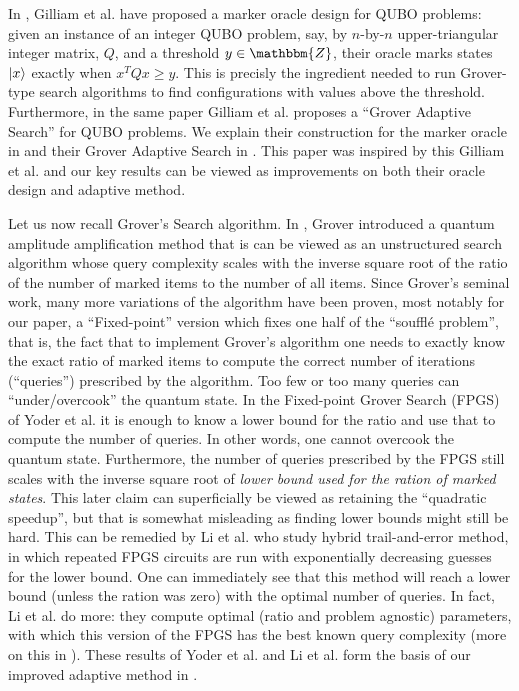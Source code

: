 \documentclass[reqno, 12pt]{amsart}
\numberwithin{equation}{section}                %
\def\Z{\mathbbm{Z}}
\begin{document}
\smallskip

In \cite{gilliam_grover_2021}, Gilliam et al. have proposed a marker oracle design for QUBO problems: given an instance of an integer QUBO problem, say, by $n$-by-$n$ upper-triangular integer matrix, $Q$, and a threshold $y \in \Z$, their oracle marks states $\ket{x}$ exactly when $x^T Q x \geqslant y$. This is precisly the ingredient needed to run Grover-type search algorithms to find configurations with values above the threshold. Furthermore, in the same paper Gilliam et al. proposes a ``Grover Adaptive Search'' for QUBO problems. We explain their construction for the marker oracle in  and their Grover Adaptive Search in . This paper was inspired by this Gilliam et al. and our key results can be viewed as improvements on both their oracle design and adaptive method.

Let us now recall Grover's Search algorithm. In \cite{grover_quantum_97}, Grover introduced a quantum amplitude amplification method that is can be viewed as an unstructured search algorithm whose query complexity scales with the inverse square root of the ratio of the number of marked items to the number of all items. Since Grover's seminal work, many more variations of the algorithm have been proven, most notably for our paper, a ``Fixed-point'' version which fixes one half of the ``souffl\'e problem'', that is, the fact that to implement Grover's algorithm one needs to exactly know the exact ratio of marked items to compute the correct number of iterations (``queries'') prescribed by the algorithm. Too few or too many queries can ``under/overcook'' the quantum state. In the Fixed-point Grover Search (FPGS) of Yoder et al. \cite{yoder_fixed_2014} it is enough to know a lower bound for the ratio and use that to compute the number of queries. In other words, one cannot overcook the quantum state. Furthermore, the number of queries prescribed by the FPGS still scales with the inverse square root of \emph{lower bound used for the ration of marked states}. This later claim can superficially be viewed as retaining the ``quadratic speedup'', but that is somewhat misleading as finding lower bounds might still be hard. This can be remedied by Li et al. \cite{li_quantum_2019} who study hybrid trail-and-error method, in which repeated FPGS circuits are run with exponentially decreasing guesses for the lower bound. One can immediately see that this method will reach a lower bound (unless the ration was zero) with the optimal number of queries. In fact, Li et al. do more: they compute optimal (ratio and problem agnostic) parameters, with which this version of the FPGS has the best known query complexity (more on this in ). These results of Yoder et al. and Li et al. form the basis of our improved adaptive method in .
\end{document}
